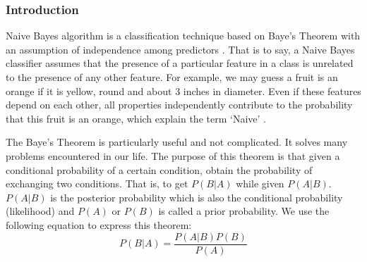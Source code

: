 \documentclass[sigconf]{acmart}
\begin{document}
\subsubsection{Introduction}

Naive Bayes algorithm is a classification technique based on Baye's Theorem with an assumption of independence among predictors \cite{nb.steps}. That is to say, a Naive Bayes classifier assumes that the presence of a particular feature in a class is unrelated to the presence of any other feature. For example, we may guess a fruit is an orange if it is yellow, round and about 3 inches in diameter. Even if these features depend on each other, all properties independently contribute to the probability that this fruit is an orange, which explain the term `Naive' \cite{nb.steps}.

The Baye's Theorem is particularly useful and not complicated. It solves many problems encountered in our life. The purpose of this theorem is that given a conditional probability of a certain condition, obtain the probability of exchanging two conditions. That is, to get $P(B|A)$ while given $P(A|B)$. $P(A|B)$ is the posterior probability which is also the conditional probability (likelihood) and $P(A)$ or $P(B)$ is called a prior probability. We use the following equation to express this theorem:
\[
    P(B|A)=\dfrac{P(A|B)P(B)}{P(A)}
\]
\end{document}
